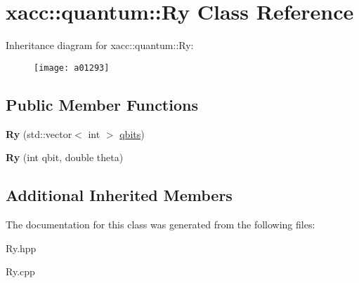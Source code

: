 \hypertarget{a01293}{}\section{xacc\+:\+:quantum\+:\+:Ry Class Reference}
\label{a01293}
Inheritance diagram for xacc\+:\+:quantum\+:\+:Ry\+:\begin{figure}[H]
\begin{center}
\leavevmode
\texttt{[image: a01293]}
\end{center}
\end{figure}
\subsection*{Public Member Functions}
\begin{DoxyCompactItemize}
\item 
\mbox{\label{a01293_a542e1c0576a8e784f6cece4c77598486}} 
{\bfseries Ry} (std\+::vector$<$ int $>$ \hyperlink{a01253_a2a56be6c2519ea65df4d06f4abae1393}{qbits})
\item 
\mbox{\label{a01293_a1cb81fe622168ba8d79fa2a78b5b0006}} 
{\bfseries Ry} (int qbit, double theta)
\end{DoxyCompactItemize}
\subsection*{Additional Inherited Members}


The documentation for this class was generated from the following files\+:\begin{DoxyCompactItemize}
\item 
Ry.\+hpp\item 
Ry.\+cpp\end{DoxyCompactItemize}
